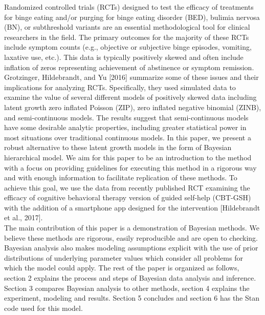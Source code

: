 \documentclass{article}
\begin{document}
Randomized controlled trials (RCTs) designed to test the efficacy of treatments for binge eating and/or purging for binge eating disorder (BED), bulimia nervosa (BN), or subthreshold variants are an essential methodological tool for clinical researchers in the field.  The primary outcomes for the majority of these RCTs include symptom counts (e.g., objective or subjective binge episodes, vomiting, laxative use, etc.). This data is typically positively skewed and often include inflation of zeros representing achievement of abstinence or symptom remission.  Grotzinger, Hildebrandt, and Yu [2016] summarize some of these issues and their implications for analyzing RCTs.  Specifically, they used simulated data to examine the value of several different models of positively skewed data including latent growth zero inflated Poisson (ZIP), zero inflated negative binomial (ZINB), and semi-continuous models.  The results suggest that semi-continuous models have some desirable analytic properties, including greater statistical power in most situations over traditional continuous models.  In this paper, we present a robust alternative to these latent growth models in the form of Bayesian hierarchical model.  We aim for this paper to be an introduction to the method with a focus on providing guidelines for executing this method in a rigorous way and with enough information to facilitate replication of these methods.  To achieve this goal, we use the data from recently published RCT examining the efficacy of cognitive behavioral therapy version of guided self-help (CBT-GSH) with the addition of a smartphone app designed for the intervention [Hildebrandt et al., 2017]. \\

The main contribution of this paper is a demonstration of Bayesian methods. We believe these methods are rigorous, easily reproducible and are open to checking. Bayesian analysis also makes modeling assumptions explicit with the use of prior distributions of underlying parameter values which consider all  problems for which the model could apply.  The rest of the paper is organized as follows, section 2 explains the process and steps of Bayesian data analysis and inference. Section 3 compares Bayesian analysis to other methods, section 4 explains the experiment, modeling and results. Section 5 concludes and section 6 has the Stan code used for this model.
\end{document}
